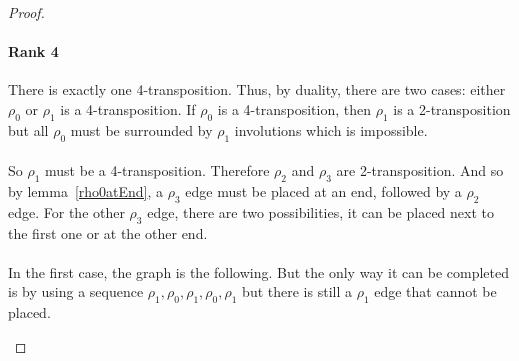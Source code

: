 \begin{proof}
  \paragraph{Rank 4}
  There is exactly one 4-transposition. Thus, by duality, there are two cases: either $\rho_0$ or $\rho_1$ is a 4-transposition. If $\rho_0$ is a 4-transposition, then $\rho_1$ is a 2-transposition but all $\rho_0$ must be surrounded by $\rho_1$ involutions which is impossible.

  \paragraph{}
  So $\rho_1$ must be a 4-transposition. Therefore $\rho_2$ and $\rho_3$ are 2-transposition. And so by lemma~\ref{rho0atEnd}, a $\rho_3$ edge must be placed at an end, followed by a $\rho_2$ edge. For the other $\rho_3$ edge, there are two possibilities, it can be placed next to the first one or at the other end.

  \paragraph{}
  In the first case, the graph is the following. But the only way it can be completed is by using a sequence $\rho_1, \rho_0, \rho_1, \rho_0, \rho_1$ but there is still a $\rho_1$ edge that cannot be placed.

  \begin{figure}[H]
    \begin{center}
\end{center}
\end{figure}
\end{proof}
